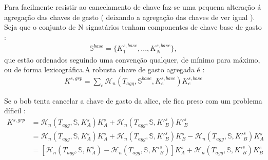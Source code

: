 Para facilmente resistir ao cancelamento de chave faz-se uma pequena alteração á agregação das chaves de gasto ( deixando a agregação das chaves de ver igual ). 
Seja que o conjunto de N signatários tenham componentes de chave base de gasto :
\begin{align*}
\mathbb{S}^{base} = \{K^{s,base}_1,...,K^{s,base}_N\} ,
\end{align*}
que estão ordenados seguindo uma convenção qualquer, de mínimo para máximo, ou de forma lexicográfica.\newline A robusta chave de gasto agregada é :
\begin{align*}
K^{s,grp} = \sum_e \mathcal{H}_n(T_{agg},\mathbb{S}^{base},K^{s,base}_e)K^{s,base}_e
\end{align*}

Se o bob tenta cancelar a chave de gasto da alice, ele fica preso com um problema díficil :
\vspace{.175cm}
\begin{align*}
    K^{s,grp} &= \mathcal{H}_n(T_{agg},\mathbb{S},K^{s}_A)K^{s}_A + \mathcal{H}_n(T_{agg},\mathbb{S},K'^{s}_B)K'^{s}_B \\
             &= \mathcal{H}_n(T_{agg},\mathbb{S},K^{s}_A)K^{s}_A + \mathcal{H}_n(T_{agg},\mathbb{S},K'^{s}_B)K^{s}_B - \mathcal{H}_n(T_{agg},\mathbb{S},K'^{s}_B)K^{s}_A \\
             &= [\mathcal{H}_n(T_{agg},\mathbb{S},K^{s}_A) - \mathcal{H}_n(T_{agg},\mathbb{S},K'^{s}_B)]K^{s}_A + \mathcal{H}_n(T_{agg},\mathbb{S},K'^{s}_B)K^{s}_B
\end{align*}

